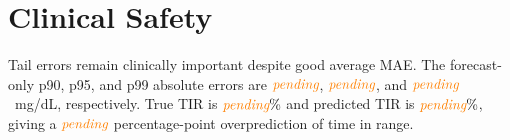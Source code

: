 \section{Clinical Safety}
\label{sec:safety}

\GeneratedSafetyInterpretation

\GeneratedSafetyTables

\GeneratedSafetyFigures

Tail errors remain clinically important despite good average MAE. The forecast-only p90, p95, and p99 absolute errors are $\textcolor{orange}{\textit{pending}}$, $\textcolor{orange}{\textit{pending}}$, and $\textcolor{orange}{\textit{pending}}$~mg/dL, respectively. True TIR is $\textcolor{orange}{\textit{pending}}\%$ and predicted TIR is $\textcolor{orange}{\textit{pending}}\%$, giving a $\textcolor{orange}{\textit{pending}}$ percentage-point overprediction of time in range.
